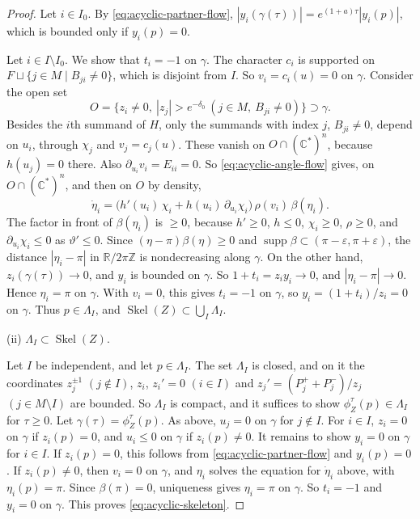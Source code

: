 \documentclass[11pt,a4paper]{article}
\newcommand{\bC}{\mathbb C}\newcommand{\bR}{\mathbb R}\newcommand{\bZ}{\mathbb Z}
\DeclareMathOperator{\Skel}{Skel}\DeclareMathOperator{\Log}{Log}
\DeclareMathOperator{\supp}{supp}
\begin{document}
\begin{proof}
Let $i\in I_0$.
By \eqref{eq:acyclic-partner-flow}, $|y_i(\gamma(\tau))|=e^{(1+a)\tau}|y_i(p)|$, which is bounded only if $y_i(p)=0$.

Let $i\in I\setminus I_0$.
We show that $t_i=-1$ on $\gamma$.
The character $c_i$ is supported on $F\sqcup\{j\in M\mid B_{ji}\ne0\}$, which is disjoint from $I$.
So $v_i=c_i(u)=0$ on $\gamma$.
Consider the open set
\[
 O=\bigl\{z_i\ne0,\ |z_j|>e^{-\delta_0}\ (j\in M,\ B_{ji}\ne0)\bigr\}\supset\gamma .
\]
Besides the $i$th summand of $H$, only the summands with index $j$, $B_{ji}\ne0$, depend on $u_i$, through $\chi_j$ and $v_j=c_j(u)$.
These vanish on $O\cap(\bC^*)^{n}$, because $h(u_j)=0$ there.
Also $\partial_{u_i}v_i=E_{ii}=0$.
So \eqref{eq:acyclic-angle-flow} gives, on $O\cap(\bC^*)^{n}$, and then on $O$ by density,
\[
 \dot\eta_i=\bigl(h'(u_i)\,\chi_i+h(u_i)\,\partial_{u_i}\chi_i\bigr)\,\rho(v_i)\,\beta(\eta_i).
\]
The factor in front of $\beta(\eta_i)$ is $\ge0$, because $h'\ge0$, $h\le0$, $\chi_i\ge0$, $\rho\ge0$, and $\partial_{u_i}\chi_i\le0$ as $\vartheta'\le0$.
Since $(\eta-\pi)\beta(\eta)\ge0$ and $\supp\beta\subset(\pi-\varepsilon,\pi+\varepsilon)$, the distance $|\eta_i-\pi|$ in $\bR/2\pi\bZ$ is nondecreasing along $\gamma$.
On the other hand, $z_i(\gamma(\tau))\to0$, and $y_i$ is bounded on $\gamma$.
So $1+t_i=z_iy_i\to0$, and $|\eta_i-\pi|\to0$.
Hence $\eta_i=\pi$ on $\gamma$.
With $v_i=0$, this gives $t_i=-1$ on $\gamma$, so $y_i=(1+t_i)/z_i=0$ on $\gamma$.
Thus $p\in\Lambda_I$, and $\Skel(Z)\subset\bigcup_I\Lambda_I$.

(ii) \( \Lambda_I \subset \Skel(Z)\). 

Let $I$ be independent, and let $p\in\Lambda_I$.
The set $\Lambda_I$ is closed, and on it the coordinates $z_j^{\pm1}$ $(j\notin I)$, $z_i$, $z_i'=0$ $(i\in I)$ and $z_j'=(P_j^++P_j^-)/z_j$ $(j\in M\setminus I)$ are bounded.
So $\Lambda_I$ is compact, and it suffices to show $\phi_Z^\tau(p)\in\Lambda_I$ for $\tau\ge0$.
Let $\gamma(\tau)=\phi_Z^\tau(p)$.
As above, $u_j=0$ on $\gamma$ for $j\notin I$.
For $i\in I$, $z_i=0$ on $\gamma$ if $z_i(p)=0$, and $u_i\le0$ on $\gamma$ if $z_i(p)\ne0$.
It remains to show $y_i=0$ on $\gamma$ for $i\in I$.
If $z_i(p)=0$, this follows from \eqref{eq:acyclic-partner-flow} and $y_i(p)=0$.
If $z_i(p)\ne0$, then $v_i=0$ on $\gamma$, and $\eta_i$ solves the equation for $\dot\eta_i$ above, with $\eta_i(p)=\pi$.
Since $\beta(\pi)=0$, uniqueness gives $\eta_i=\pi$ on $\gamma$.
So $t_i=-1$ and $y_i=0$ on $\gamma$.
This proves \eqref{eq:acyclic-skeleton}.
\end{proof}
\end{document}
